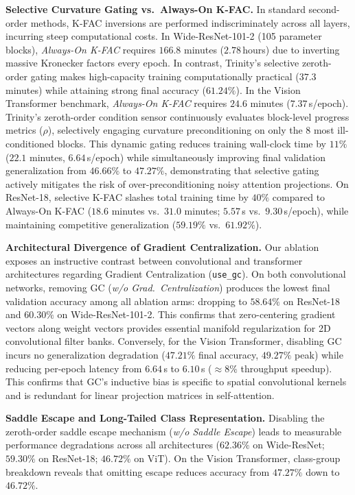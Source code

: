 \documentclass[conference]{IEEEtran}
\begin{document}
\textbf{Selective Curvature Gating vs.\ Always-On K-FAC.}
In standard second-order methods, K-FAC inversions are performed indiscriminately across all layers, incurring steep computational costs. In Wide-ResNet-101-2 (105 parameter blocks), \textit{Always-On K-FAC} requires $166.8$ minutes ($2.78$\,hours) due to inverting massive Kronecker factors every epoch. In contrast, Trinity's selective zeroth-order gating makes high-capacity training computationally practical ($37.3$ minutes) while attaining strong final accuracy ($61.24\%$). In the Vision Transformer benchmark, \textit{Always-On K-FAC} requires $24.6$ minutes ($7.37$\,s/epoch). Trinity's zeroth-order condition sensor continuously evaluates block-level progress metrics ($\rho$), selectively engaging curvature preconditioning on only the 8 most ill-conditioned blocks. This dynamic gating reduces training wall-clock time by $11\%$ ($22.1$ minutes, $6.64$\,s/epoch) while simultaneously improving final validation generalization from $46.66\%$ to $47.27\%$, demonstrating that selective gating actively mitigates the risk of over-preconditioning noisy attention projections. On ResNet-18, selective K-FAC slashes total training time by $40\%$ compared to Always-On K-FAC ($18.6$ minutes vs.\ $31.0$ minutes; $5.57$\,s vs.\ $9.30$\,s/epoch), while maintaining competitive generalization ($59.19\%$ vs.\ $61.92\%$).

\textbf{Architectural Divergence of Gradient Centralization.}
Our ablation exposes an instructive contrast between convolutional and transformer architectures regarding Gradient Centralization (\texttt{use\_gc}). On both convolutional networks, removing GC (\textit{w/o Grad.\ Centralization}) produces the lowest final validation accuracy among all ablation arms: dropping to $58.64\%$ on ResNet-18 and $60.30\%$ on Wide-ResNet-101-2. This confirms that zero-centering gradient vectors along weight vectors provides essential manifold regularization for 2D convolutional filter banks. Conversely, for the Vision Transformer, disabling GC incurs no generalization degradation ($47.21\%$ final accuracy, $49.27\%$ peak) while reducing per-epoch latency from $6.64$\,s to $6.10$\,s ($\approx 8\%$ throughput speedup). This confirms that GC's inductive bias is specific to spatial convolutional kernels and is redundant for linear projection matrices in self-attention.

\textbf{Saddle Escape and Long-Tailed Class Representation.}
Disabling the zeroth-order saddle escape mechanism (\textit{w/o Saddle Escape}) leads to measurable performance degradations across all architectures ($62.36\%$ on Wide-ResNet; $59.30\%$ on ResNet-18; $46.72\%$ on ViT). On the Vision Transformer, class-group breakdown reveals that omitting escape reduces accuracy from $47.27\%$ down to $46.72\%$.
\end{document}

